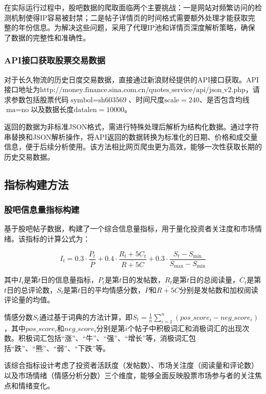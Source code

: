 \documentclass[12pt, a4paper]{article}
\begin{document}
在实际运行过程中，股吧数据的爬取面临两个主要挑战：一是网站对频繁访问的检测机制使得IP容易被封禁；二是帖子详情页的时间格式需要额外处理才能获取完整的年份信息。为解决这些问题，采用了代理IP池和详情页深度解析策略，确保了数据的完整性和准确性。

\subsubsection{API接口获取股票交易数据}
对于长久物流的历史日度交易数据，直接通过新浪财经提供的API接口获取。API接口地址为$\text{http://money.finance.sina.com.cn/quotes\_service/api/json\_v2.php}$，请求参数包括股票代码$\text{symbol} = \text{sh603569}$、时间尺度$\text{scale} = 240$、是否包含均线$\text{ma} = \text{no}$以及数据长度$\text{datalen} = 10000$。

返回的数据为非标准JSON格式，需进行特殊处理后解析为结构化数据。通过字符串替换和JSON解析操作，将API返回的数据转换为标准化的日期、价格和成交量信息，便于后续分析使用。该方法相比网页爬虫更为高效，能够一次性获取长期的历史交易数据。

\subsection{指标构建方法}

\subsubsection{股吧信息量指标构建}
基于股吧帖子数据，构建了一个综合信息量指标，用于量化投资者关注度和市场情绪。该指标的计算公式为：

\begin{equation}
I_t = 0.3 \cdot \frac{P_t}{\overline{P}} + 0.4 \cdot \frac{R_t + 5C_t}{\overline{R + 5C}} + 0.3 \cdot \frac{S_t - S_{\min}}{S_{\max} - S_{\min}}
\end{equation}

其中$I_t$是第$t$日的信息量指标，$P_t$是第$t$日的发帖数，$R_t$是第$t$日的总阅读量，$C_t$是第$t$日的总评论数，$S_t$是第$t$日的平均情感分数，$\overline{P}$和$\overline{R + 5C}$分别是发帖数和加权阅读评论量的均值。

情感分数$S_t$通过基于词典的方法计算，即$S_t = \frac{1}{n} \sum_{i=1}^{n} (pos\_score_i - neg\_score_i)$，其中$pos\_score_i$和$neg\_score_i$分别是第$i$个帖子中积极词汇和消极词汇的出现次数。积极词汇包括“涨”、“牛”、“强”、“增长”等，消极词汇包括“跌”、“熊”、“弱”、“下跌”等。

该综合指标设计考虑了投资者活跃度（发帖数）、市场关注度（阅读量和评论数）以及市场情绪（情感分析分数）三个维度，能够全面反映股票市场参与者的关注焦点和情绪变化。
\end{document}
